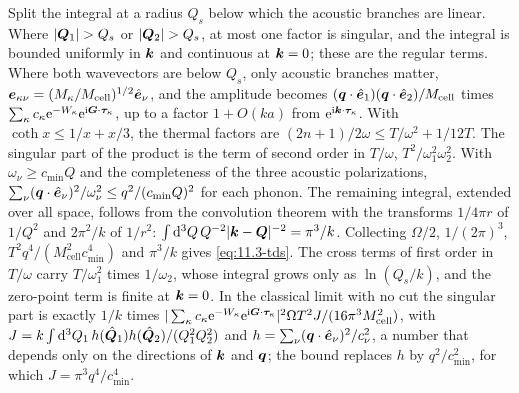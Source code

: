 Split the integral at a radius $Q_s$ below which the acoustic branches are linear. Where $|\bm{Q}_1| > Q_s$ or $|\bm{Q}_2| > Q_s$, at most one factor is singular, and the integral is bounded uniformly in $\bm{k}$ and continuous at $\bm{k} = 0$; these are the regular terms. Where both wavevectors are below $Q_s$, only acoustic branches matter, $\bm{e}_{\kappa\nu} = (M_\kappa/M_{\mathrm{cell}})^{1/2}\hat{\bm{e}}_\nu$, and the amplitude becomes $(\bm{q}\cdot\hat{\bm{e}}_1)(\bm{q}\cdot\hat{\bm{e}}_2)/M_{\mathrm{cell}}$ times $\sum_\kappa c_\kappa\mathrm{e}^{-W_\kappa}\mathrm{e}^{\mathrm{i}\bm{G}\cdot\bm{\tau}_\kappa}$, up to a factor $1 + O(ka)$ from $\mathrm{e}^{\mathrm{i}\bm{k}\cdot\bm{\tau}_\kappa}$. With $\coth x \le 1/x + x/3$, the thermal factors are $(2n + 1)/2\omega \le T/\omega^2 + 1/12T$. The singular part of the product is the term of second order in $T/\omega$, $T^2/\omega_1^2\omega_2^2$. With $\omega_\nu \ge c_{\mathrm{min}}Q$ and the completeness of the three acoustic polarizations, $\sum_\nu(\bm{q}\cdot\hat{\bm{e}}_\nu)^2/\omega_\nu^2 \le q^2/(c_{\mathrm{min}}Q)^2$ for each phonon. The remaining integral, extended over all space, follows from the convolution theorem with the transforms $1/4\pi r$ of $1/Q^2$ and $2\pi^2/k$ of $1/r^2$: $\int\mathrm{d}^3Q\,Q^{-2}|\bm{k} - \bm{Q}|^{-2} = \pi^3/k$. Collecting $\Omega/2$, $1/(2\pi)^3$, $T^2q^4/(M_{\mathrm{cell}}^2c_{\mathrm{min}}^4)$ and $\pi^3/k$ gives \cref{eq:11.3-tds}. The cross terms of first order in $T/\omega$ carry $T/\omega_1^2$ times $1/\omega_2$, whose integral grows only as $\ln(Q_s/k)$, and the zero-point term is finite at $\bm{k} = 0$. In the classical limit with no cut the singular part is exactly $1/k$ times $|\sum_\kappa c_\kappa\mathrm{e}^{-W_\kappa}\mathrm{e}^{\mathrm{i}\bm{G}\cdot\bm{\tau}_\kappa}|^2\Omega T^2J/(16\pi^3M_{\mathrm{cell}}^2)$, with $J = k\int\mathrm{d}^3Q_1\,h(\hat{\bm{Q}}_1)h(\hat{\bm{Q}}_2)/(Q_1^2Q_2^2)$ and $h = \sum_\nu(\bm{q}\cdot\hat{\bm{e}}_\nu)^2/c_\nu^2$, a number that depends only on the directions of $\bm{k}$ and $\bm{q}$; the bound replaces $h$ by $q^2/c_{\mathrm{min}}^2$, for which $J = \pi^3q^4/c_{\mathrm{min}}^4$.
